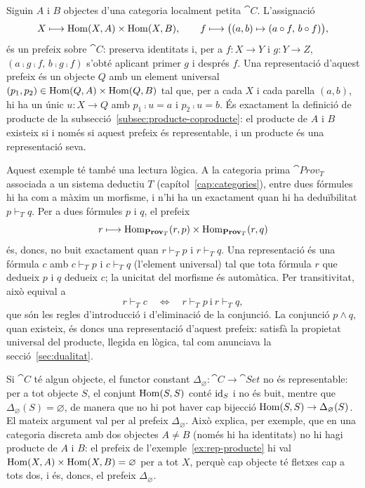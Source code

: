 \begin{exemple}\label{ex:rep-producte}
Siguin $A$ i $B$ objectes d'una categoria localment petita $\cat{C}$. L'assignació
\[
X\longmapsto\operatorname{Hom}(X,A)\times\operatorname{Hom}(X,B),
\qquad
f\longmapsto\bigl((a,b)\mapsto(a\circ f,\,b\circ f)\bigr),
\]
és un prefeix sobre $\cat{C}$: preserva identitats i, per a $f\colon X\to Y$ i $g\colon Y\to Z$, $(a\comp g\comp f,\,b\comp g\comp f)$ s'obté aplicant primer $g$ i després $f$. Una representació d'aquest prefeix és un objecte $Q$ amb un element universal $(p_1,p_2)\in\operatorname{Hom}(Q,A)\times\operatorname{Hom}(Q,B)$ tal que, per a cada $X$ i cada parella $(a,b)$, hi ha un únic $u\colon X\to Q$ amb $p_1\comp u=a$ i $p_2\comp u=b$. És exactament la definició de producte de la subsecció~\ref{subsec:producte-coproducte}: el producte de $A$ i $B$ existeix si i només si aquest prefeix és representable, i un producte és una representació seva.

Aquest exemple té també una lectura lògica. A la categoria prima $\cat{Prov}_T$ associada a un sistema deductiu $T$ (capítol~\ref{cap:categories}), entre dues fórmules hi ha com a màxim un morfisme, i n'hi ha un exactament quan hi ha deduïbilitat $p\vdash_T q$. Per a dues fórmules $p$ i $q$, el prefeix
\[
r\longmapsto\operatorname{Hom}_{\mathbf{Prov}_T}(r,p)\times\operatorname{Hom}_{\mathbf{Prov}_T}(r,q)
\]
és, doncs, no buit exactament quan $r\vdash_T p$ i $r\vdash_T q$. Una representació és una fórmula $c$ amb $c\vdash_T p$ i $c\vdash_T q$ (l'element universal) tal que tota fórmula $r$ que dedueix $p$ i $q$ dedueix $c$; la unicitat del morfisme és automàtica. Per transitivitat, això equival a
\[
r\vdash_T c
\quad\Longleftrightarrow\quad
r\vdash_T p\ \text{i}\ r\vdash_T q,
\]
que són les regles d'introducció i d'eliminació de la conjunció. La conjunció $p\wedge q$, quan existeix, és doncs una representació d'aquest prefeix: satisfà la propietat universal del producte, llegida en lògica, tal com anunciava la secció~\ref{sec:dualitat}.
\end{exemple}

\begin{exemple}\label{ex:no-representable}
Si $\cat{C}$ té algun objecte, el functor constant $\Delta_\varnothing\colon\cat{C}\to\cat{Set}$ no és representable: per a tot objecte $S$, el conjunt $\operatorname{Hom}(S,S)$ conté $\operatorname{id}_S$ i no és buit, mentre que $\Delta_\varnothing(S)=\varnothing$, de manera que no hi pot haver cap bijecció $\operatorname{Hom}(S,S)\to\Delta_\varnothing(S)$. El mateix argument val per al prefeix $\Delta_\varnothing$. Això explica, per exemple, que en una categoria discreta amb dos objectes $A\neq B$ (només hi ha identitats) no hi hagi producte de $A$ i $B$: el prefeix de l'exemple~\ref{ex:rep-producte} hi val $\operatorname{Hom}(X,A)\times\operatorname{Hom}(X,B)=\varnothing$ per a tot $X$, perquè cap objecte té fletxes cap a tots dos, i és, doncs, el prefeix $\Delta_\varnothing$.
\end{exemple}

